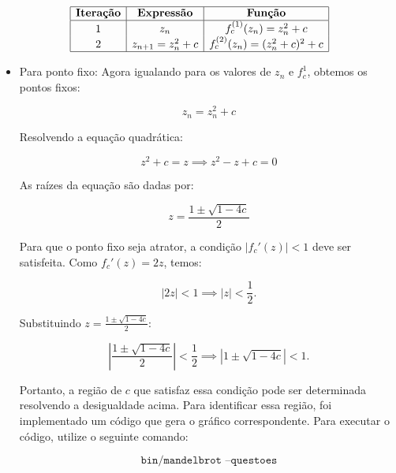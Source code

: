\begin{enumerate}[label=(\alph*)]
        \[
        \begin{array}{|c|c|c|}
        \hline
        \textbf{Iteração} & \textbf{Expressão} & \textbf{Função} \\
        \hline
        1 & z_n & f_c^{(1)}(z_n) = z_n^2 + c \\
        2 & z_{n+1} = z_n^2 + c & f_c^{(2)}(z_n) = (z_n^2 + c)^2 + c \\
        \hline
        \end{array}
        \]


        \begin{itemize}
            \item Para ponto fixo:
                Agora igualando para os valores de \(z_n\) e \(f^{1}_c\), obtemos os pontos fixos:
            
                        
                    \begin{equation}
                        z_n =  z_n^2 + c
                    \label{eq:questao_2_item_b_1}
                    \end{equation}
           
                Resolvendo a equação quadrática:

                \[
                z^2 + c = z \implies z^2 - z + c = 0
                \]

                As raízes da equação são dadas por:

                \[
                z = \frac{1 \pm \sqrt{1 - 4c}}{2}
                \]

                Para que o ponto fixo seja atrator, a condição \( |f_c'(z)| < 1 \) deve ser satisfeita. Como \( f_c'(z) = 2z \), temos:

                \[
                |2z| < 1 \implies |z| < \frac{1}{2}.
                \]

                Substituindo \( z = \frac{1 \pm \sqrt{1 - 4c}}{2} \):

                \[
                \left| \frac{1 \pm \sqrt{1 - 4c}}{2} \right| < \frac{1}{2} \implies |1 \pm \sqrt{1 - 4c}| < 1.
                \]

                Portanto, a região de \( c \) que satisfaz essa condição pode ser determinada resolvendo a desigualdade acima. Para identificar essa região, foi implementado um código que gera o gráfico correspondente. Para executar o código, utilize o seguinte comando:

                \[
                \texttt{bin/mandelbrot --questoes}
                \]


\end{itemize}
\end{enumerate}

